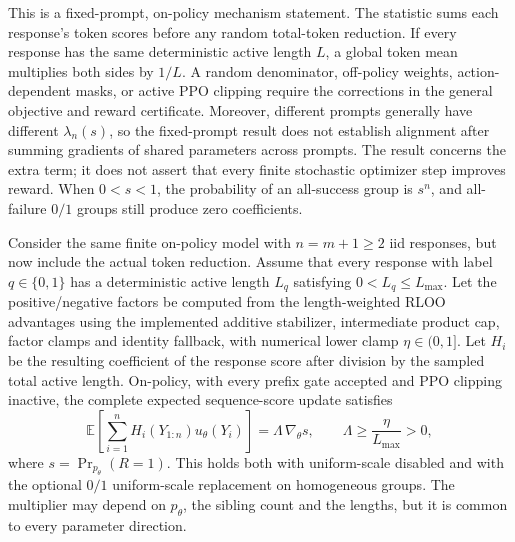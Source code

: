 This is a fixed-prompt, on-policy mechanism statement. The statistic sums
each response's token scores before any random total-token reduction.
If every response has the same deterministic active length $L$, a global
token mean multiplies both sides by $1/L$. A random denominator, off-policy
weights, action-dependent masks, or active PPO clipping require the
corrections in the general objective and reward certificate. Moreover,
different prompts generally have different $\lambda_n(s)$, so the
fixed-prompt result does not establish alignment after summing gradients
of shared parameters across prompts. The result concerns the extra term;
it does not assert that every finite stochastic optimizer step improves
reward. When $0<s<1$, the probability of an all-success group is $s^n$,
and all-failure $0/1$ groups still produce zero coefficients.

\begin{proposition}
\label{prop:binary-complete-update}
Consider the same finite on-policy model with $n=m+1\ge2$ iid responses,
but now include the actual token reduction. Assume that every response with
label $q\in\{0,1\}$ has a deterministic active length $L_q$ satisfying
$0<L_q\le L_{\max}$. Let the positive/negative factors be computed from
the length-weighted RLOO advantages using the implemented additive
stabilizer, intermediate product cap, factor clamps and identity fallback,
with numerical lower clamp $\eta\in(0,1]$. Let $H_i$ be the resulting
coefficient of the response score after division by the sampled total active
length. On-policy, with every prefix gate accepted and PPO clipping
inactive, the complete expected sequence-score update satisfies
\begin{equation*}
    \mathbb E\!\left[\sum_{i=1}^{n}H_i(Y_{1:n})
        u_\theta(Y_i)\right]
      = \Lambda\,\nabla_\theta s,
    \qquad
    \Lambda\ge \frac{\eta}{L_{\max}}>0,
\end{equation*}
where $s=\Pr_{p_\theta}(R=1)$. This holds both with uniform-scale
disabled and with the optional $0/1$ uniform-scale replacement on homogeneous
groups. The multiplier may depend on $p_\theta$, the sibling count and the
lengths, but it is common to every parameter direction.
\end{proposition}

